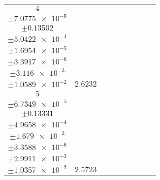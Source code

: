 \documentclass[8pt]{article}
\begin{document}
\begin{longtable}[l]{c c c c c c c c c}
$\num{4}$ & \begin{tabular}[c]{@{}c@{}}$\num{3.0419e-2}$ \\ $\pm\num{7.0775e-5}$\end{tabular} & \begin{tabular}[c]{@{}c@{}}$\num{-0.54518}$ \\ $\pm\num{0.13502}$\end{tabular} & \begin{tabular}[c]{@{}c@{}}$\num{-5.6982}$ \\ $\pm\num{5.0422e-4}$\end{tabular} & \begin{tabular}[c]{@{}c@{}}$\num{1.8521e+3}$ \\ $\pm\num{1.6954e-3}$\end{tabular} & \begin{tabular}[c]{@{}c@{}}$\num{3.7052}$ \\ $\pm\num{3.3917e-6}$\end{tabular} & \begin{tabular}[c]{@{}c@{}}$\num{1.1672}$ \\ $\pm\num{3.116e-3}$\end{tabular} & \begin{tabular}[c]{@{}c@{}}$\num{4.234}$ \\ $\pm\num{1.0589e-2}$\end{tabular} & $\num{2.6232}$\\
$\num{5}$ & \begin{tabular}[c]{@{}c@{}}$\num{2.9711e-2}$ \\ $\pm\num{6.7349e-5}$\end{tabular} & \begin{tabular}[c]{@{}c@{}}$\num{-0.1196}$ \\ $\pm\num{0.13331}$\end{tabular} & \begin{tabular}[c]{@{}c@{}}$\num{5.6998}$ \\ $\pm\num{4.9658e-4}$\end{tabular} & \begin{tabular}[c]{@{}c@{}}$\num{1.8635e+3}$ \\ $\pm\num{1.679e-3}$\end{tabular} & \begin{tabular}[c]{@{}c@{}}$\num{3.728}$ \\ $\pm\num{3.3588e-6}$\end{tabular} & \begin{tabular}[c]{@{}c@{}}$\num{1.1367}$ \\ $\pm\num{2.9911e-3}$\end{tabular} & \begin{tabular}[c]{@{}c@{}}$\num{4.1758}$ \\ $\pm\num{1.0357e-2}$\end{tabular} & $\num{2.5723}$\\

\end{longtable}
\end{document}

